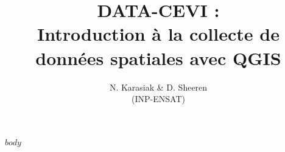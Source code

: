\documentclass[12]{scrartcl}
\begin{document}
\title{DATA-CEVI :\\ Introduction à la collecte de données spatiales avec QGIS}
\date{}
\author{N. Karasiak \& D. Sheeren \\(INP-ENSAT)}
\maketitle
\tableofcontents
\pagebreak

$body$
\end{document}
